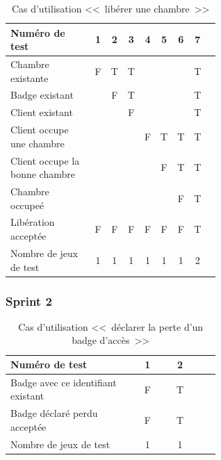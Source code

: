 \documentclass[11pt,article]{article}
\begin{document}
        \begin{table}[htbp!]
            \begin{tabular}{|p{0.6\linewidth}|c|c|c|c|c|c|c|c|}
                \hline
                Numéro de test
                    &1&2&3&4&5&6&7\\
                \hline
                \hline

                Chambre existante
                    &F&T&T& & & &T\\
                \hline
                Badge existant
                    & &F&T& & & &T\\
                \hline
                Client existant
                    & & &F& & & &T\\
                \hline
				\hline
                Client occupe une chambre
                    & & & &F&T&T&T\\
                \hline
                Client occupe la bonne chambre
                    & & & & &F&T&T\\
				\hline
				\hline
				Chambre occupeé
					& & & & & &F&T\\
                \hline
                \hline                Libération acceptée
                    &F&F&F&F&F&F&T\\
                \hline
                \hline
                Nombre de jeux de test
                    &1&1&1&1&1&1&2 \\
                \hline
            \end{tabular}
            \caption{Cas d'utilisation <<~libérer une chambre~>>}
        \end{table}

		\newpage

		        \subsubsection{Sprint 2}

		            \begin{table}[htbp!]
		                \begin{tabular}{|p{0.6\linewidth}|c|c|c|}
		                    \hline
		                    Numéro de test
		                        &1&2\\
		                    \hline
		                    \hline
		                   Badge avec ce identifiant existant
		                        &F&T\\
		                    \hline
		                    \hline
		                    Badge déclaré perdu acceptée
		                        &F&T\\
		                    \hline
		                    \hline
		                    Nombre de jeux de test
		                        &1&1\\
		                    \hline
		                \end{tabular}
		                \caption{Cas d'utilisation <<~déclarer la perte d'un badge d'accès~>>}
		            \end{table}
\newpage
\end{document}

